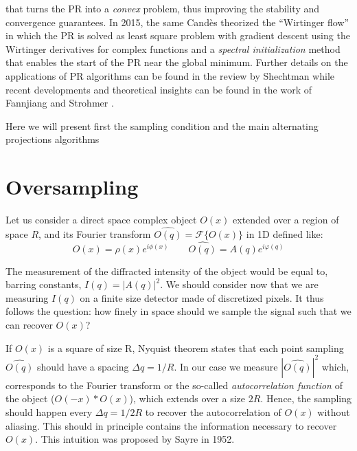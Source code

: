 that turns the PR into a \textit{convex} problem, thus improving the stability and convergence guarantees. In 2015, the same 
Cand{\`e}s \cite{CandesLiSoltanolkotabi2015} theorized the ``Wirtinger flow'' in which the PR is solved as least square 
problem with gradient descent using the Wirtinger derivatives \cite{Wirtinger1927} for complex functions and a \textit{spectral initialization} 
method that enables the start of the PR near the global minimum. Further details on the applications of PR algorithms 
can be found in the review by Shechtman \cite{Miao_2015ReviewPhaseRetrieval} while recent developments and theoretical 
insights can be found in the work of Fannjiang and Strohmer \cite{Fannjiang2020}. 

Here we will present first the sampling condition and the main alternating projections algorithms 

\section{Oversampling}

Let us consider a direct space complex object $O(x) $ extended over a region of space $R$, and its Fourier transform 
$ \widehat{O(q)} =\mathcal{F}\{ O(x)\}$ in 1D defined like: 
\begin{equation}
    O(x) = \rho(x)e^{i\phi(x)} \qquad \widehat{O(q)} = A(q)e^{i\varphi(q)}
\end{equation}

The measurement of the diffracted intensity of the object would be equal to, barring constants, $I(q) = |A(q)|^2$. 
We should consider now that we are measuring $I(q)$ on a finite size detector made of discretized pixels. It thus 
follows the question: how finely in space should we sample the signal such that we can recover $O(x)$? 

If $O(x) $ is a square of size R, Nyquist theorem states that each point sampling $ \widehat{O(q)}$ should have a 
spacing $ \Delta q = 1/R$. In our case we measure $|\widehat{O(q)}|^2$ which, corresponds to the Fourier transform or the 
so-called \textit{autocorrelation function} of the object ($O(-x)\ast O(x)$), which extends over a size $2R$. Hence, the sampling should 
happen every $ \Delta q = 1/2R$ to recover the autocorrelation of $O(x) $ without aliasing. This should in principle 
contains the information necessary to recover $O(x) $. This intuition was proposed by Sayre in 1952.


